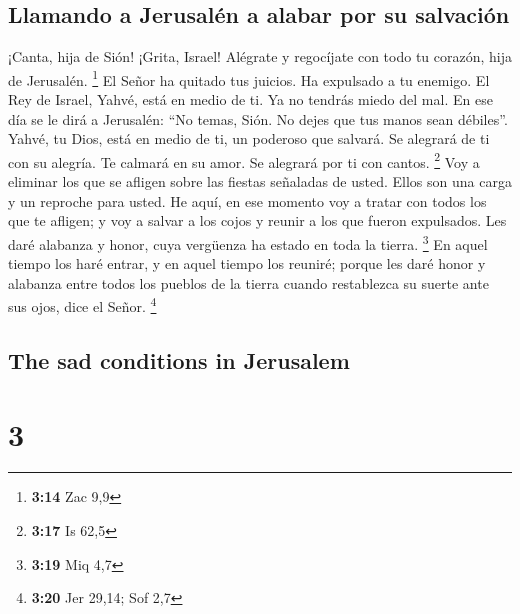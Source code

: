 \begin{paracol}{2}
\hypertarget{llamando-a-jerusaluxe9n-a-alabar-por-su-salvaciuxf3n}{%
\subsection{Llamando a Jerusalén a alabar por su
salvación}\label{llamando-a-jerusaluxe9n-a-alabar-por-su-salvaciuxf3n}}

 ¡Canta, hija de Sión! ¡Grita, Israel! Alégrate y
regocíjate con todo tu corazón, hija de Jerusalén. \footnote{\textbf{3:14}
  Zac 9,9}  El Señor ha quitado tus juicios. Ha expulsado
a tu enemigo. El Rey de Israel, Yahvé, está en medio de ti. Ya no
tendrás miedo del mal.  En ese día se le dirá a
Jerusalén: ``No temas, Sión. No dejes que tus manos sean débiles''.
 Yahvé, tu Dios, está en medio de ti, un poderoso que
salvará. Se alegrará de ti con su alegría. Te calmará en su amor. Se
alegrará por ti con cantos. \footnote{\textbf{3:17} Is 62,5}
 Voy a eliminar los que se afligen sobre las fiestas
señaladas de usted. Ellos son una carga y un reproche para usted.
 He aquí, en ese momento voy a tratar con todos los que
te afligen; y voy a salvar a los cojos y reunir a los que fueron
expulsados. Les daré alabanza y honor, cuya vergüenza ha estado en toda
la tierra. \footnote{\textbf{3:19} Miq 4,7}  En aquel
tiempo los haré entrar, y en aquel tiempo los reuniré; porque les daré
honor y alabanza entre todos los pueblos de la tierra cuando restablezca
su suerte ante sus ojos, dice el Señor. \footnote{\textbf{3:20} Jer
  29,14; Sof 2,7} \switchcolumn
\begin{otherlanguage}{english}

\hypertarget{the-sad-conditions-in-jerusalem}{%
\subsection{The sad conditions in
Jerusalem}\label{the-sad-conditions-in-jerusalem}}

\hypertarget{section-5}{%
\section{3}\label{section-5}}


\end{otherlanguage}
\end{paracol}
